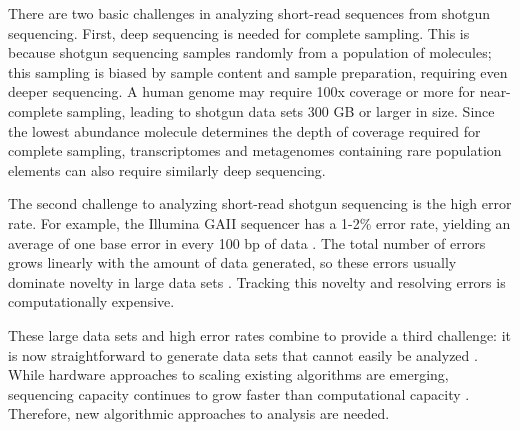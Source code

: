 \documentclass{pnastwo}
\begin{document}
\begin{article}
There are two basic challenges in analyzing short-read sequences from
shotgun sequencing. First, deep sequencing is needed for complete
sampling. This is because shotgun sequencing samples randomly from a
population of molecules; this sampling is biased by sample content and
sample preparation, requiring even deeper sequencing. A human genome
may require 100x coverage or more for near-complete sampling, leading
to shotgun data sets 300 GB or larger in size\cite{pubmed21187386}.
Since the lowest abundance molecule determines the depth of coverage
required for complete sampling, transcriptomes and metagenomes
containing rare population elements can also require similarly
deep sequencing.

The second challenge to analyzing short-read shotgun sequencing is the
high error rate.  For example, the Illumina GAII sequencer has a 1-2\% error
rate, yielding an average of one base error in every 100 bp of data
\cite{pubmed19997069}.  The total number of errors grows linearly with
the amount of data generated, so these errors usually dominate
novelty in large data sets \cite{pubmed21245053}.  Tracking this
novelty and resolving errors is computationally expensive.

These large data sets and high error rates combine to provide a third
challenge: it is now straightforward to generate data sets that cannot
easily be analyzed \cite{pubmed21867570}.  While hardware approaches
to scaling existing algorithms are emerging, sequencing capacity
continues to grow faster than computational capacity
\cite{pubmed20441614}.  Therefore, new algorithmic approaches to
analysis are needed.


\end{article}
\end{document}
